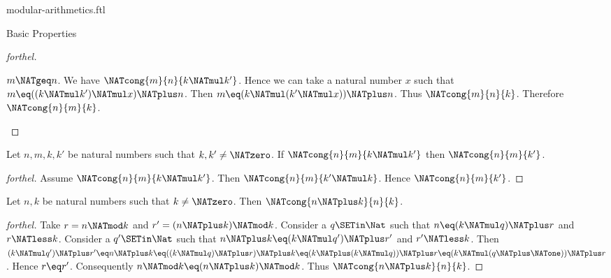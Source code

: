 \documentclass{naproche-library}
\begin{document}
\begin{smodule}[title=Modular Arithmetics]{modular-arithmetics.ftl}
\begin{sfragment}{Basic Properties}
\begin{proof}[forthel]
    \begin{case}{$m \NATgeq n$.}
      We have $\NATcong{m}{n}{k \NATmul k'}$.
      Hence we can take a natural number $x$ such that $m \eq ((k \NATmul k') \NATmul x) \NATplus n$.
      Then $m \eq (k \NATmul (k' \NATmul x)) \NATplus n$.
      Thus $\NATcong{m}{n}{k}$.
      Therefore $\NATcong{n}{m}{k}$.
    \end{case}
  \end{proof}

  \begin{corollary}[forthel,id=ARITHMETIC_08_5895145169879040]
    Let $n, m, k, k'$ be natural numbers such that $k, k' \neq \NATzero$.
    If $\NATcong{n}{m}{k \NATmul k'}$ then $\NATcong{n}{m}{k'}$.
  \end{corollary}
  \begin{proof}[forthel]
    Assume $\NATcong{n}{m}{k \NATmul k'}$.
    Then $\NATcong{n}{m}{k' \NATmul k}$.
    Hence $\NATcong{n}{m}{k'}$.
  \end{proof}

  \begin{proposition}[forthel,id=ARITHMETIC_08_5984712287846400]
    Let $n, k$ be natural numbers such that $k \neq \NATzero$.
    Then $\NATcong{n \NATplus k}{n}{k}$.
  \end{proposition}
  \begin{proof}[forthel]
    Take $r = n \NATmod k$ and $r' = (n \NATplus k) \NATmod k$.
    Consider a $q \SETin \Nat$ such that $n \eq (k \NATmul q) \NATplus r$ and $r \NATless k$.
    Consider a $q' \SETin \Nat$ such that $n \NATplus k \eq (k \NATmul q') \NATplus r'$ and
    $r' \NATless k$.
    Then $(k \NATmul q') \NATplus r'
      \eq n \NATplus k
      \eq ((k \NATmul q) \NATplus r) \NATplus k
      \eq (k \NATplus (k \NATmul q)) \NATplus r
      \eq (k \NATmul (q \NATplus \NATone)) \NATplus r$.
    Hence $r \eq r'$.
    Consequently $n \NATmod k \eq (n \NATplus k) \NATmod k$.
    Thus $\NATcong{n \NATplus k}{n}{k}$.
  \end{proof}
\end{sfragment}
\end{smodule}
\end{document}
